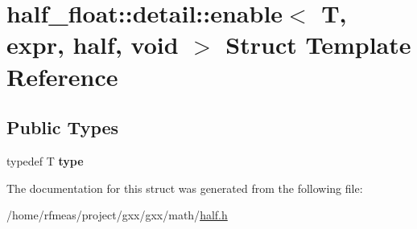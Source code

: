 \hypertarget{structhalf__float_1_1detail_1_1enable_3_01T_00_01expr_00_01half_00_01void_01_4}{}\section{half\+\_\+float\+:\+:detail\+:\+:enable$<$ T, expr, half, void $>$ Struct Template Reference}
\label{structhalf__float_1_1detail_1_1enable_3_01T_00_01expr_00_01half_00_01void_01_4}
\subsection*{Public Types}
\begin{DoxyCompactItemize}
\item 
typedef T {\bfseries type}\hypertarget{structhalf__float_1_1detail_1_1enable_3_01T_00_01expr_00_01half_00_01void_01_4_a40f8fe0ca6c2b5ec34d68b539ac0d399}{}\label{structhalf__float_1_1detail_1_1enable_3_01T_00_01expr_00_01half_00_01void_01_4_a40f8fe0ca6c2b5ec34d68b539ac0d399}

\end{DoxyCompactItemize}


The documentation for this struct was generated from the following file\+:\begin{DoxyCompactItemize}
\item 
/home/rfmeas/project/gxx/gxx/math/\hyperlink{half_8h}{half.\+h}\end{DoxyCompactItemize}
